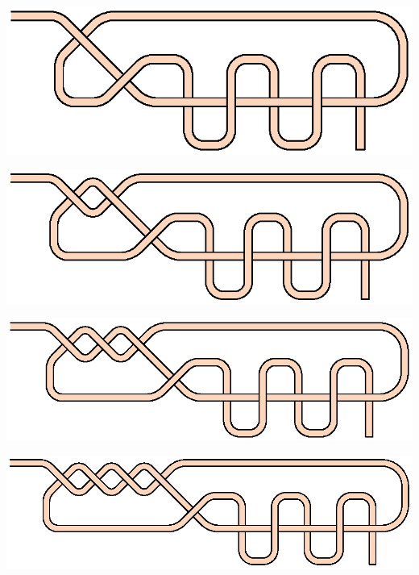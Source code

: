 \includegraphics{images/s-05-a1b2.eps}

\includegraphics{images/s-05-a2b2.eps}

\includegraphics{images/s-05-a3b2.eps}

\includegraphics{images/s-05-a4b2.eps}
